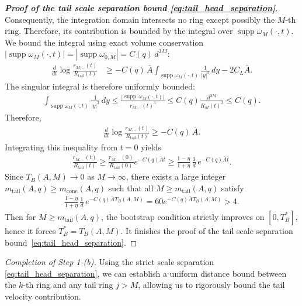 \documentclass[reqno,11pt]{amsart}
\newcommand{\supp}{\operatorname{supp}}
\begin{document}
\begin{proof}[\textbf{Proof of the tail scale separation bound \eqref{eq:tail_head_separation}}]
Consequently, the integration domain intersects no ring except possibly the $M$-th ring. Therefore, its contribution is bounded by the integral over $\supp \omega_M(\cdot,t)$.
  We bound the integral using exact volume conservation $|\supp \omega_M(\cdot,t)|=|\supp\omega_{0,M}|= C(q) \,d^{3M}$:
\begin{align*}
    \frac{d}{dt} \log \frac{r_{M,-}(t)}{R_{\mathrm{tail}}(t)} 
    &\ge - C (q) \, \bar A \int_{\supp \omega_M(\cdot,t)} \frac{1}{|y|^3} \, dy - 2C_L \bar A.
\end{align*}
 The singular integral is therefore uniformly bounded:
\begin{align*}
    \int_{\supp \omega_M(\cdot,t)} \frac{1}{|y|^3} \, dy 
    \le \frac{|\supp \, \omega_{M}(\cdot,t)|}{r_{M,-}(t)^3} 
    \le C(q)\frac{d^{3M}}{R_{M}(t)^3 }
    \le C(q).
\end{align*}
Therefore,
\begin{align*}
    \frac{d}{dt} \log \frac{r_{M,-}(t)}{R_{\mathrm{tail}}(t)} \ge -C(q)\, \bar A.
\end{align*}
Integrating this inequality from $t=0$ yields 
\begin{align*}
\frac{r_{M,-}(t)}{R_{\mathrm{tail}}(t)} 
\geq \frac{r_{M,-}(0)}{R_{\mathrm{tail}}(0)} e^{-C(q) \bar A t}
\ge \frac{1-\eta}{1+\eta} \,\frac{1}{d}\,  e^{-C(q) \bar A t}.
\end{align*}
Since $T_B(A,M)\to 0$ as $M\to\infty$,  there exists a large integer $m_{\mathrm{tail}}(A,q)\geq m_{\mathrm{cone}}(A,q)$ such that all $M\geq m_{\mathrm{tail}}(A,q)$ satisfy
    \begin{align}
    \label{eq:m_tail_def}
    \frac{1-\eta}{1+\eta} \, \frac{1}{d} \, e^{-C(q) \bar A T_B(A,M)} = 60 e^{-C(q) \bar A T_B(A,M)} >4.
    \end{align}
Then for $M\geq m_{\mathrm{tail}}(A,q)$,  the bootstrap condition strictly improves on $[0, T^*_B]$, hence it forces $T^*_B = T_B(A,M)$. It finishes the proof of the tail scale separation bound~\eqref{eq:tail_head_separation}.
\end{proof}


\noindent \emph{Completion of Step 1-(b).}
Using the strict scale separation \eqref{eq:tail_head_separation}, we can establish a uniform distance bound between the $k$-th ring and any tail ring $j > M$, allowing us to rigorously bound the tail velocity contribution.
\end{document}
